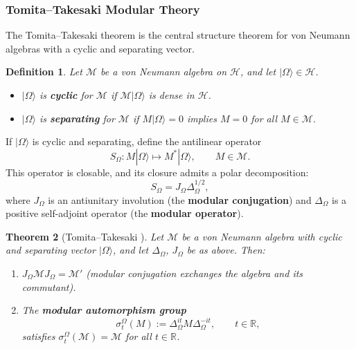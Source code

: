 \documentclass[12pt,a4paper]{article}
\newtheorem{theorem}{Theorem}[section]
\newtheorem{definition}[theorem]{Definition}
\begin{document}
\subsubsection{Tomita--Takesaki Modular Theory}
\label{sec:TT}

The Tomita--Takesaki theorem is the central structure theorem for von Neumann algebras with a cyclic and separating vector.

\begin{definition}
Let $\mathcal{M}$ be a von Neumann algebra on $\mathcal{H}$, and let $|\Omega\rangle \in \mathcal{H}$.
\begin{itemize}
\item $|\Omega\rangle$ is \textbf{cyclic} for $\mathcal{M}$ if $\mathcal{M}|\Omega\rangle$ is dense in $\mathcal{H}$.
\item $|\Omega\rangle$ is \textbf{separating} for $\mathcal{M}$ if $M|\Omega\rangle = 0$ implies $M = 0$ for all $M \in \mathcal{M}$.
\end{itemize}
\end{definition}

If $|\Omega\rangle$ is cyclic and separating, define the antilinear operator
\begin{equation}
S_\Omega : M|\Omega\rangle \mapsto M^*|\Omega\rangle, \qquad M \in \mathcal{M}.
\end{equation}
This operator is closable, and its closure admits a polar decomposition:
\begin{equation}
S_\Omega = J_\Omega \Delta_\Omega^{1/2},
\end{equation}
where $J_\Omega$ is an antiunitary involution (the \textbf{modular conjugation}) and $\Delta_\Omega$ is a positive self-adjoint operator (the \textbf{modular operator}).

\begin{theorem}[Tomita--Takesaki {\cite{Takesaki2003}}]
\label{thm:TT}
Let $\mathcal{M}$ be a von Neumann algebra with cyclic and separating vector $|\Omega\rangle$, and let $\Delta_\Omega$, $J_\Omega$ be as above. Then:
\begin{enumerate}
\item[(a)] $J_\Omega \mathcal{M} J_\Omega = \mathcal{M}'$ (modular conjugation exchanges the algebra and its commutant).
\item[(b)] The \textbf{modular automorphism group}
\begin{equation}
\sigma_t^\Omega(M) := \Delta_\Omega^{it} M \Delta_\Omega^{-it}, \qquad t \in \mathbb{R},
\end{equation}
satisfies $\sigma_t^\Omega(\mathcal{M}) = \mathcal{M}$ for all $t \in \mathbb{R}$.
\end{enumerate}
\end{theorem}
\end{document}
